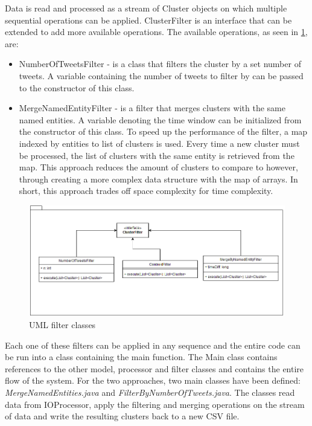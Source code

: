 \documentclass[a4paper,portrait,12pt]{article}
\begin{document}
Data is read and processed as a stream of Cluster objects on which multiple sequential operations can be applied.
ClusterFilter is an interface that can be extended to add more available operations.
The available operations, as seen in \ref{fig:filterUML}, are:
\begin{itemize}
	\item NumberOfTweetsFilter - is a class that filters the cluster by a set number of tweets.
	      A variable containing the number of tweets to filter by can be passed to the constructor of this class.
	\item MergeNamedEntityFilter - is a filter that merges clusters with the same named entities.
		  A variable denoting the time window can be initialized from the constructor of this class.
		  To speed up the performance of the filter, a map indexed by entities to list of clusters is used.
		  Every time a new cluster must be processed, the list of clusters with the same entity is retrieved from the map. 
		  This approach reduces the amount of clusters to compare to however, through creating a more complex data structure with the map of arrays.
		  In short, this approach trades off space complexity for time complexity. 

\end{itemize}

\begin{figure}[h!]
	\centering
	\includegraphics[width=0.7\linewidth]{images/filterUML.png}
	\caption{UML filter classes}
	\label{fig:filterUML}
\end{figure}

Each one of these filters can be applied in any sequence and the entire code can be run into a class containing the main function.
The Main class contains references to the other model, processor and filter classes and contains the entire flow of the system.
For the two approaches, two main classes have been defined: \textit{MergeNamedEntities.java} and \textit{FilterByNumberOfTweets.java}.
The classes read data from IOProcessor, apply the filtering and merging operations on the stream of data and write the resulting clusters back to a new CSV file.
\end{document}
